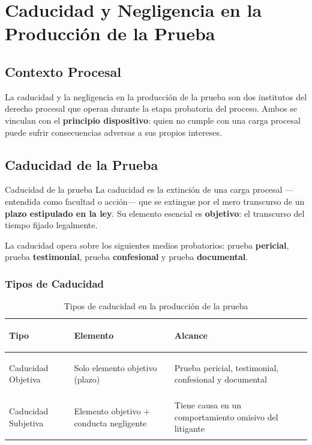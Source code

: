 \documentclass[12pt,oneside]{book}
\begin{document}
\chapter{Caducidad y Negligencia en la Producción de la Prueba}

\section{Contexto Procesal}

La caducidad y la negligencia en la producción de la prueba son dos institutos del derecho procesal que operan durante la etapa probatoria del proceso. Ambos se vinculan con el \textbf{principio dispositivo}: quien no cumple con una carga procesal puede sufrir consecuencias adversas a sus propios intereses.

\section{Caducidad de la Prueba}

\begin{definition}{Caducidad de la prueba}
La caducidad es la extinción de una carga procesal —entendida como facultad o acción— que se extingue por el mero transcurso de un \textbf{plazo estipulado en la ley}. Su elemento esencial es \textbf{objetivo}: el transcurso del tiempo fijado legalmente.
\end{definition}

La caducidad opera sobre los siguientes medios probatorios: prueba \textbf{pericial}, prueba \textbf{testimonial}, prueba \textbf{confesional} y prueba \textbf{documental}.

\subsection{Tipos de Caducidad}

\begin{table}[H]
\centering
\begin{tabularx}{\textwidth}{
    >{\bfseries\raggedright\arraybackslash}p{}
    >{\raggedright\arraybackslash}X
    >{\raggedright\arraybackslash}X
}
\toprule
\textbf{Tipo} & \textbf{Elemento} & \textbf{Alcance} \\
\midrule
Caducidad Objetiva  & Solo elemento objetivo (plazo) & Prueba pericial, testimonial, confesional y documental \\
\addlinespace
Caducidad Subjetiva & Elemento objetivo + conducta negligente & Tiene causa en un comportamiento omisivo del litigante \\
\bottomrule
\end{tabularx}
\caption{Tipos de caducidad en la producción de la prueba}
\end{table}
\end{document}

